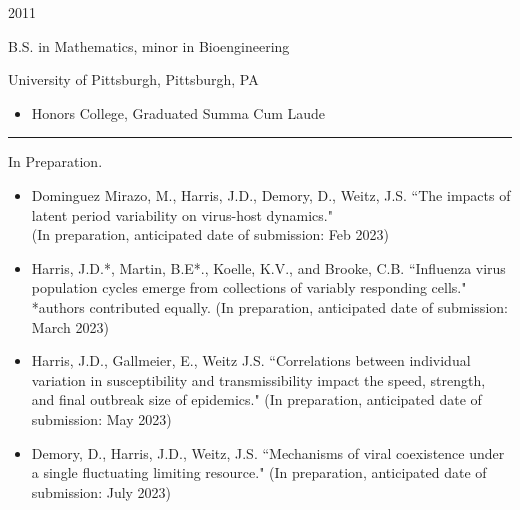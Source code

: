 \documentclass[a4paper,10pt]{article}
\newlength{\cvcolumngapwidth}
\newlength{\cvleftcolumnwidth}
\newlength{\cvrightcolumnwidth}
\newcommand{\cvsectionstyle}[1]{{\normalsize\cvsectionfont\textcolor{cvsectioncolor}{#1}}}
\newcommand{\cvtitlestyle}[1]{{\large\cvtitlefont\textcolor{cvtitlecolor}{#1}}}
\newcommand{\cvdurationstyle}[1]{{\small\cvdurationfont\textcolor{cvdurationcolor}{#1}}}
\newlength{\cvafteritemskipamount}
\newlength{\cvaftersectionskipamount}
\newlength{\cvbetweensectionandheadingextraskipamount}
\newlength{\cvaftertitleskipamount}
\newlength{\cvparskip}
\newcommand{\cvsection}[1]{
            \begin{minipage}[t]{\cvleftcolumnwidth}
                \raggedleft\cvsectionstyle{#1}
            \end{minipage}%
            \hspace{\cvcolumngapwidth}%
            \begin{minipage}[t]{\cvrightcolumnwidth}
                \textcolor{cvrulecolor}{\rule{\cvrightcolumnwidth}{0.3mm}}
            \end{minipage}
        
            \vspace{\cvaftersectionskipamount}
        }
\newcommand{\cvitem}[2]{
            \begin{minipage}[t]{\cvleftcolumnwidth}
                \raggedleft #1
            \end{minipage}%
            \hspace{\cvcolumngapwidth}%
            \begin{minipage}[t]{\cvrightcolumnwidth}
                \setlength{\parskip}{\cvparskip} #2
            \end{minipage}
        
            \vspace{\cvafteritemskipamount}
        }
\newcommand{\cvtitle}[1]{
            \cvtitlestyle{#1}
        
            \vspace{\cvaftertitleskipamount}
            \vspace{-\cvparskip}
        }
\begin{document}
        \cvitem{
            \cvdurationstyle{2011}
        }{
            \cvtitle{B.S. in Mathematics, minor in Bioengineering}
        	University of Pittsburgh, Pittsburgh, PA
            \begin{itemize}[leftmargin=*]
                \item  Honors College, Graduated Summa Cum Laude
            \end{itemize}
        }
        
        \cvsection{PUBLICATIONS}
        
        \cvitem{
            \cvdurationstyle{In Preparation.}
        }{
            \begin{itemize}[leftmargin=*]

	
	        	\item Dominguez Mirazo, M., Harris, J.D., Demory, D., Weitz, J.S. ``The impacts of latent period variability on virus-host dynamics." \\ (In preparation, anticipated date of submission: Feb 2023)	
		\item Harris, J.D.*, Martin, B.E*., Koelle, K.V., and Brooke, C.B. ``Influenza virus population cycles emerge from collections of variably responding cells." *authors contributed equally. (In preparation, anticipated date of submission: March 2023)
		\item Harris, J.D., Gallmeier, E., Weitz J.S. ``Correlations between individual variation in susceptibility and transmissibility impact the speed, strength, and final outbreak size of epidemics." (In preparation, anticipated date of submission: May 2023)
		\item Demory, D., Harris, J.D., Weitz, J.S. ``Mechanisms of viral coexistence under a single fluctuating limiting resource." (In preparation, anticipated date of submission: July 2023)	
			
	 \end{itemize}
	}    	
	
	
%
%	
%
%
%			
        
\end{document}
